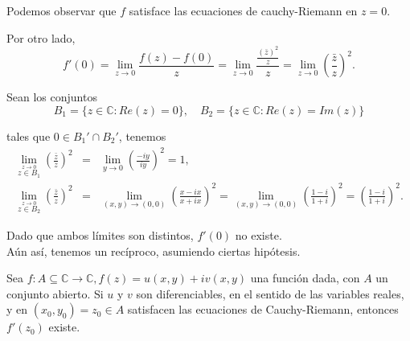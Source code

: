 Podemos observar que $f$ satisface las ecuaciones de cauchy-Riemann en $z= 0$. 

Por otro lado,
$$f'(0) = \lim_{z \to 0} \frac{f(z) - f(0)}{z} =\lim_{z \to 0} \frac{\frac{(\bar{z})^2}{z}}{z} = \lim_{z \to 0} \left( \frac{\bar{z}}{z}  \right)^2. $$

Sean los conjuntos
$$B_1 = \{z \in \mathbb{C} : Re(z) = 0\}, \quad B_2 = \{z \in \mathbb{C} : Re( z) = Im(z)\}$$

tales que $0 \in B_1' \cap B_2'$, tenemos
\begin{eqnarray*}
\lim_{\overset{z \to 0}{z \in B_1}} \left( \frac{\bar{z}}{z}  \right)^2 &=& \lim_{y \to 0} \left( \frac{-iy}{iy} \right)^2 = 1, \\
\lim_{\overset{z \to 0}{z \in B_2}} \left( \frac{\bar{z}}{z}  \right)^2 &=& \lim_{(x,y) \to (0,0)} \left( \frac{x-ix}{x+ix} \right)^2 = \lim_{(x,y) \to (0,0)} \left( \frac{1-i}{1+i} \right)^2 =  \left( \frac{1-i}{1+i} \right)^2.
\end{eqnarray*}

Dado que ambos límites son distintos, $f'(0)$ no existe.
\\

Aún así, tenemos un recíproco, asumiendo ciertas hipótesis.

\begin{teorema} \label{ECR}
Sea $f: A \subseteq \mathbb{C} \rightarrow \mathbb{C}, f(z) = u(x,y) + iv(x,y)$ una función dada, con $A$ un conjunto abierto. Si $u$ y $v$ son diferenciables, en el sentido de las variables reales, y en $(x_0,y_0) = z_0 \in A$ satisfacen las ecuaciones de Cauchy-Riemann, entonces $f'(z_0)$ existe.
\end{teorema}

